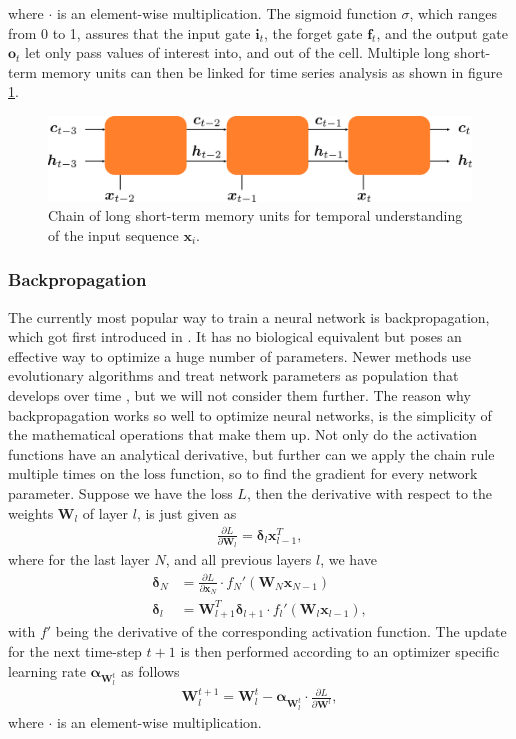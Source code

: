 where $\cdot$ is an element-wise multiplication. The sigmoid function $\sigma$, which ranges from 0 to 1, assures that the input gate $\bm{i}_t$, the forget gate $\bm{f}_t$, and the output gate $\bm{o}_t$ let only pass values of interest into, and out of the cell. Multiple long short-term memory units can then be linked for time series analysis as shown in figure \ref{fig::221_lstm_chain}.
\begin{figure}[h!]
	\centering
	\includegraphics[scale=.28]{chapters/02_background/img/lstm_chain.png}
	\caption{Chain of long short-term memory units for temporal understanding of the input sequence $\bm{x}_i$.}
	\label{fig::221_lstm_chain}
\end{figure}
\FloatBarrier
\subsubsection{Backpropagation}
The currently most popular way to train a neural network is backpropagation, which got first introduced in \cite{linnainmaa1970representation}. It has no biological equivalent but poses an effective way to optimize a huge number of parameters. Newer methods use evolutionary algorithms and treat network parameters as population that develops over time \cite{montana1989training}, but we will not consider them further. The reason why backpropagation works so well to optimize neural networks, is the simplicity of the mathematical operations that make them up. Not only do the activation functions have an analytical derivative, but further can we apply the chain rule multiple times on the loss function, so to find the gradient for every network parameter. Suppose we have the loss $L$, then the derivative with respect to the weights $\bm{W}_l$ of layer $l$, is just given as
\begin{align}
	\frac{\partial L}{\partial \bm{W}_l} = \bm{\delta}_l\bm{x}_{l-1}^T,
	\label{eq::221_bp}
\end{align}
where for the last layer $N$, and all previous layers $l$, we have
\begin{align}
	\bm{\delta}_N &= \frac{\partial L}{\partial \bm{x}_N} \cdot f_N'(\bm{W}_N\bm{x}_{N-1}) \\
	\bm{\delta}_l &= \bm{W}^T_{l+1}\bm{\delta}_{l+1} \cdot f_{l}'(\bm{W}_l\bm{x}_{l-1}),
\end{align} %
with $f'$ being the derivative of the corresponding activation function. The update for the next time-step $t+1$ is then performed according to an optimizer specific learning rate $\bm{\alpha}_{\bm{W}^t_l}$ as follows
\begin{align}
	\bm{W}_l^{t+1} = \bm{W}_l^t - \bm{\alpha}_{\bm{W}^t_l}\cdot\frac{\partial L}{\partial \bm{W}^l},
\end{align}
where $\cdot$ is an element-wise multiplication.